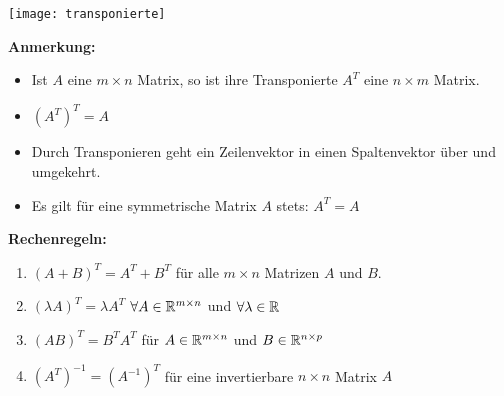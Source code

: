 \texttt{[image: transponierte]}

\textbf{Anmerkung:}
\begin{itemize}
    \item Ist $A$ eine $m \times n$ Matrix, so ist ihre Transponierte $A^T$ eine $n \times m$ Matrix.
    \item $(A^T)^T = A$
    \item Durch Transponieren geht ein Zeilenvektor in einen Spaltenvektor über und umgekehrt.
    \item Es gilt für eine symmetrische Matrix $A$ stets: $A^T = A$
\end{itemize}

\textbf{Rechenregeln:}
\begin{enumerate}
    \item $(A + B)^T = A^T + B^T$ für alle $m \times n$ Matrizen $A$ und $B$.
    \item $(\lambda A)^T = \lambda A^T$ $\forall A \in \mathbb{R}^{m \times n}$ und $\forall \lambda \in \mathbb{R}$
    \item $(AB)^T = B^T A^T$ für $A \in \mathbb{R}^{m \times n}$ und $B \in \mathbb{R}^{n \times p}$
    \item $(A^T)^{-1} = (A^{-1})^T$ für eine invertierbare $n \times n$ Matrix $A$
\end{enumerate}